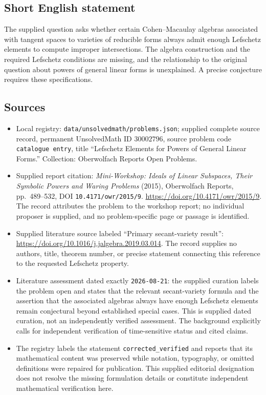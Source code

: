 \documentclass[11pt]{article}
\begin{document}
\subsection{Short English statement}
The supplied question asks whether certain Cohen--Macaulay algebras associated with tangent spaces to varieties of reducible forms always admit enough Lefschetz elements to compute improper intersections. The algebra construction and the required Lefschetz conditions are missing, and the relationship to the original question about powers of general linear forms is unexplained. A precise conjecture requires these specifications.
\subsection{Sources}
\begin{itemize}
\item Local registry: \texttt{data/unsolvedmath/problems.json}; supplied complete source record, permanent UnsolvedMath ID \(30002796\), source problem code \texttt{catalogue entry}, title ``Lefschetz Elements for Powers of General Linear Forms.'' Collection: Oberwolfach Reports Open Problems.
\item Supplied report citation: \emph{Mini-Workshop: Ideals of Linear Subspaces, Their Symbolic Powers and Waring Problems} (2015), Oberwolfach Reports, pp.~489--532, DOI \texttt{10.4171/owr/2015/9}. \url{https://doi.org/10.4171/owr/2015/9}. The record attributes the problem to the workshop report; no individual proposer is supplied, and no problem-specific page or passage is identified.
\item Supplied literature source labeled ``Primary secant-variety result'': \url{https://doi.org/10.1016/j.jalgebra.2019.03.014}. The record supplies no authors, title, theorem number, or precise statement connecting this reference to the requested Lefschetz property.
\item Literature assessment dated exactly \texttt{2026-08-21}: the supplied curation labels the problem open and states that the relevant secant-variety formula and the assertion that the associated algebras always have enough Lefschetz elements remain conjectural beyond established special cases. This is supplied dated curation, not an independently verified assessment. The background explicitly calls for independent verification of time-sensitive status and cited claims.
\item The registry labels the statement \texttt{corrected\_verified} and reports that its mathematical content was preserved while notation, typography, or omitted definitions were repaired for publication. This supplied editorial designation does not resolve the missing formulation details or constitute independent mathematical verification here.
\end{itemize}
\end{document}
